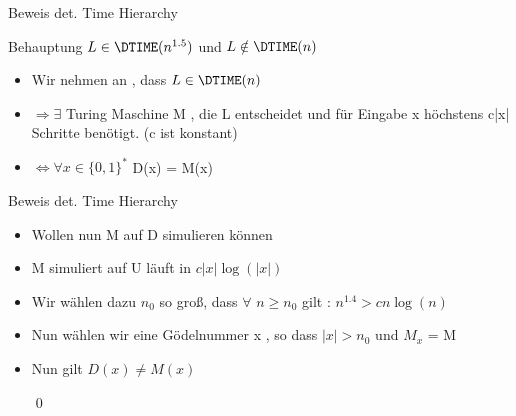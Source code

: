 \begin{frame}{Beweis det. Time Hierarchy}
	\begin{block}{Behauptung}
		$L \in \DTIME(n^{1.5})$ und $L \notin \DTIME(n)$
	\end{block}
	\pause
	\begin{itemize}[<+->]
		\item Wir nehmen an , dass $L \in \DTIME(n)$
		\item $\Rightarrow \exists$ Turing Maschine M , die L entscheidet und für Eingabe x  				höchstens c|x| Schritte benötigt. (c ist konstant)
		\item $\Leftrightarrow \forall x \in {\lbrace 0,1 \rbrace }^{*}$ D(x) = M(x)
	\end{itemize}
\end{frame}

\begin{frame}{Beweis det. Time Hierarchy}
	\begin{itemize}[<+->]
		\item Wollen nun M auf D simulieren können
		\item M simuliert auf U läuft in $c|x|\log(|x|)$
		\item Wir wählen dazu $n_0$ so groß, dass $\forall$ $n \geq n_0$ gilt :
			$n^{1.4} > cn\log(n)$		
		\item Nun wählen wir eine Gödelnummer x , so dass $|x| > n_0$ und $M_x$ = M
		\item Nun gilt $D(x) \neq M(x)$ 
		
		\qed 
	\end{itemize}
\end{frame}
